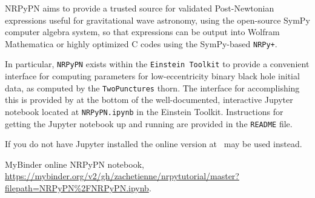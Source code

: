 NRPyPN aims to provide a trusted source for validated
Post-Newtonian expressions useful for gravitational wave astronomy,
using the open-source SymPy computer algebra
system, so that expressions can be output into Wolfram
Mathematica or highly optimized C codes using the SymPy-based
\texttt{NRPy+}.

In particular, \texttt{NRPyPN} exists within the \texttt{Einstein
  Toolkit} to provide a convenient interface for computing
parameters for low-eccentricity binary black hole initial data, as
computed by the \texttt{TwoPunctures} thorn. The interface for
accomplishing this is provided by at the bottom of the
well-documented, interactive Jupyter notebook located at
\texttt{NRPyPN.ipynb} in the Einstein Toolkit. Instructions for
getting the Jupyter notebook up and running are provided in the
\texttt{README} file.

If you do not have Jupyter installed the online version
at~\cite{EinsteinInitialData_NRPyPN_MyBinder} may be used instead.

\begin{thebibliography}{9}

MyBinder online NRPyPN notebook,
\url{https://mybinder.org/v2/gh/zachetienne/nrpytutorial/master?filepath=NRPyPN%2FNRPyPN.ipynb}.

\end{thebibliography}




